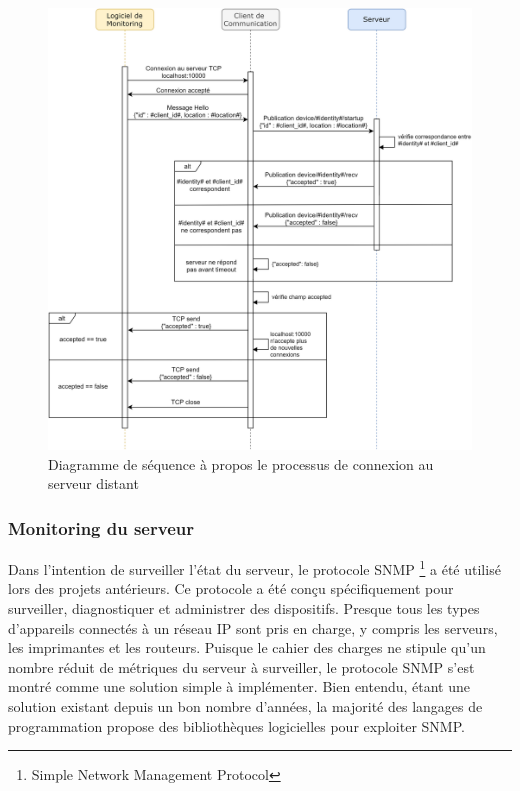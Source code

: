 \begin{figure}[ht!]
  \includegraphics[width=\textwidth]{img/app/con_protocol.png}
  \caption{Diagramme de séquence à propos le processus de connexion au serveur distant}
  \label{fig:seq111}
\end{figure}

\newpage
\newpage


\subsubsection{Monitoring du serveur}

\noindent
Dans l'intention de surveiller l'état du serveur, le protocole SNMP \footnote{Simple Network Management Protocol} a été utilisé lors des projets antérieurs. Ce protocole a été conçu spécifiquement pour surveiller, diagnostiquer et administrer des dispositifs. Presque tous les types d'appareils connectés à un réseau IP sont pris en charge, y compris les serveurs, les imprimantes et les routeurs. Puisque le cahier des charges ne stipule qu'un nombre réduit de métriques du serveur à surveiller, le protocole SNMP s'est montré comme une solution simple à implémenter. Bien entendu, étant une solution existant depuis un bon nombre d'années, la majorité des langages de programmation propose des bibliothèques logicielles pour exploiter SNMP.

